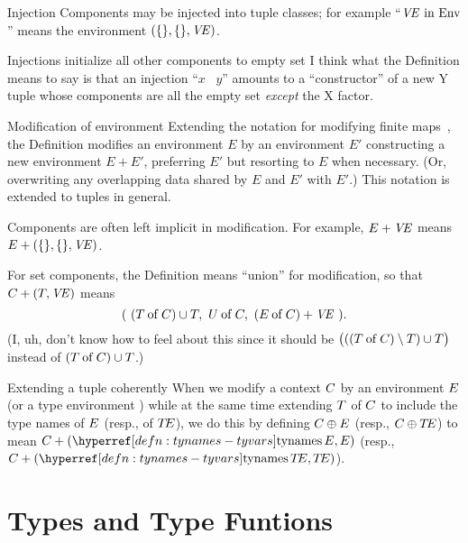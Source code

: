 \begin{definition}{Injection}
Components may be injected into tuple classes; for example
``$\textit{V\kern-.05emE\/}\ \mbox{\rm in}\ {\rm Env}$'' means the environment
$(\{\},\{\},\textit{V\kern-.05emE\/})$.
\end{definition}

\begin{remark}{Injections initialize all other components to empty set}
I think what the Definition means to say is that an injection ``$x$ \In\ $y$''
amounts to a ``constructor'' of a new Y tuple whose components are all
the empty set \emph{except} the X factor.
\end{remark}

\begin{convention}{Modification of environment}
Extending the notation for modifying finite maps~,
the Definition modifies an environment $E$ by an environment $E'$
constructing a new environment $E+E'$, preferring $E'$ but resorting to
$E$ when necessary. (Or, overwriting any overlapping data shared by $E$
and $E'$ with $E'$.) This notation is extended to
tuples in general.

Components are often left implicit in modification. For example, $E+\textit{V\kern-.05emE\/}$
means $E+(\{\},\{\},\textit{V\kern-.05emE\/})$.

For set components, the Definition means ``union'' for modification, so
that $C+(T,\textit{V\kern-.05emE\/})$ means
\begin{equation*}
(\ (\of{\T}{\C})\cup\T,\ \of{\U}{\C},\ (\of{\E}{\C})+\VE\ ).
\end{equation*}
(I, uh, don't know how to feel about this since it should be $\bigl(((T \mathbin{\rm of} C)\setminus T)\cup T\bigr)$
instead of $(T \mathbin{\rm of} C)\cup T$.)
\end{convention}

\begin{definition}{Extending a tuple coherently}
When we modify a context $C$ by an environment $E$ (or a type
environment \TE) while at the same time extending $T$ of $C$ to
include the type names of $E$ (resp., of $\mbox{$T\!E$}$), we do this by defining
$C\oplus E$ (resp., $C\oplus\mbox{$T\!E$}$) to mean
$\C+(\TyNamesFcn\E,\E)$ (resp., $\C+(\TyNamesFcn\TE,\TE)$).
\end{definition}

\section{Types and Type Funtions}\label{section:type-functions}

